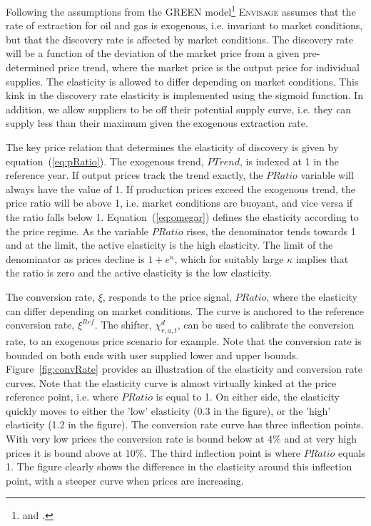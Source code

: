 \documentclass[11pt,letterpaper]{report}
\begin{document}
Following the assumptions from the GREEN model\footnote{\cite{Burniauxetal1992} and \cite{GREENDvdM1994}.}
\textsc{Envisage} assumes that the rate of extraction for oil and gas is
exogenous, i.e. invariant to market conditions, but that
the discovery rate is affected by market conditions.
The discovery rate will be a function of the deviation of
the market price from a given pre-determined price trend,
where the market price is the output price for individual supplies. The elasticity is allowed to differ depending on
market conditions. This kink in the discovery rate elasticity
is implemented using the sigmoid function. In addition,
we allow suppliers to be off their potential supply
curve, i.e. they can supply less than their maximum given
the exogenous extraction rate.

The key price relation that determines the elasticity
of discovery is given by equation~(\ref{eq:pRatio}).
The exogenous trend, $\mathit{PTrend}$, is indexed at 1 in the
reference year. If output prices track the trend
exactly, the $\mathit{PRatio}$ variable will always have the value of 1.
If production prices exceed the exogenous trend, the
price ratio will be above 1, i.e. market conditions
are buoyant, and vice versa if the ratio falls below 1.
Equation~(\ref{eq:omegar}) defines the elasticity according
to the price regime. As the variable $\mathit{PRatio}$ rises,
the denominator tends towards 1 and at the limit, the
active elasticity is the high elasticity. The limit of
the denominator as prices decline is $1+e^\kappa$, which for
suitably large $\kappa$ implies that the ratio  is zero and the
active elasticity is the low elasticity.

The conversion rate, $\xi$, responds to the price signal, $\mathit{PRatio}$,
where the elasticity can differ depending on market conditions. The
curve is anchored to the reference conversion rate, $\xi^{\mathit{Ref}}$.
The shifter, $\chi^d_{r,a,t}$, can be used to calibrate the
conversion rate, to an exogenous price scenario for example.
Note that the conversion rate is bounded on both ends with user
supplied lower and upper bounds. Figure~\ref{fig:convRate}
provides an illustration of the elasticity and conversion rate
curves. Note that the elasticity curve is almost virtually kinked
at the price reference point, i.e. where $\mathit{PRatio}$ is equal to 1.
On either side, the elasticity quickly moves to either the 'low' elasticity (0.3
in the figure), or the 'high' elasticity (1.2 in the figure).
The conversion rate curve has three inflection points. With very low prices the
conversion rate is bound below at 4\% and at very high prices it is bound
above at 10\%. The third inflection point is where $\mathit{PRatio}$
equals 1. The figure clearly shows the difference in the elasticity around
this inflection point, with a steeper curve when prices are increasing.
\end{document}
